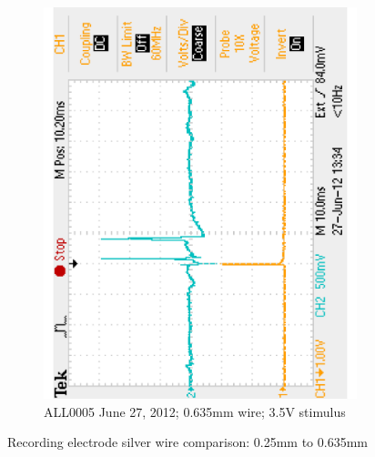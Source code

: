 \begin{figure}[H]
\begin{singlespace}
\begin{subfigure}[b]{0.48\textwidth}
		\includegraphics[trim=0 0.1in 0 0.1in,clip,angle=-90,width=\textwidth]{./figures/F0005TEK_22a_120627} %
	\caption{ALL0005 June 27, 2012; 0.635mm wire; 3.5V stimulus}
	\end{subfigure}
	\caption{Recording electrode silver wire comparison: 0.25mm to 0.635mm\label{fig:30to22}}
	\end{singlespace}
\end{figure}
	
